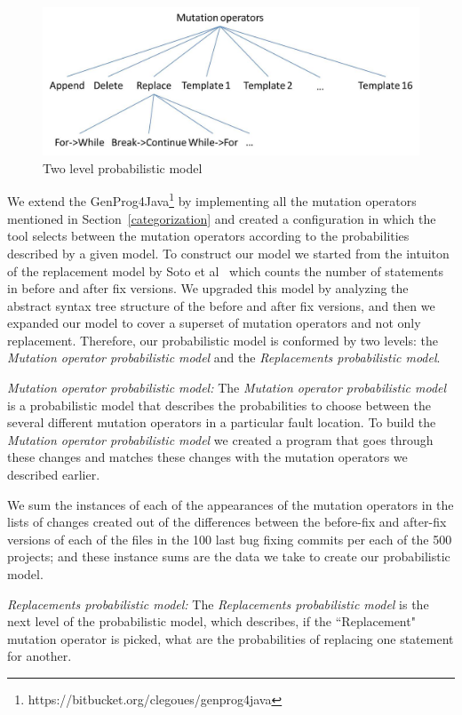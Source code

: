 \documentclass[conference]{IEEEtran}
\begin{document}
\begin{figure}[!h]
  \centering
    \includegraphics[scale=0.4]{Picture2}
  \caption{Two level probabilistic model}
  \label{fig:probModel}
\end{figure}

We extend the GenProg4Java\footnote{https://bitbucket.org/clegoues/genprog4java}
by implementing all the mutation operators mentioned in
Section~\ref{categorization} and created a configuration in which the tool 
selects between the mutation operators according to the probabilities described by
a given model. To construct our model we started from the intuiton of the replacement model by Soto et al~\cite{Soto15} which counts the number of statements in before and after fix versions. We upgraded this model by analyzing the abstract syntax tree structure of the before and after fix versions, and then we expanded our model to cover a superset of mutation operators and not only replacement. Therefore, our probabilistic model is conformed by two levels: the 
\textit{Mutation operator probabilistic model} and 
the \textit{Replacements probabilistic model}.

\emph{Mutation operator probabilistic model:}
The \textit{Mutation operator probabilistic model} is a probabilistic model that 
describes the probabilities to choose between the several different mutation 
operators in a particular fault location.
%
To build the \textit{Mutation operator probabilistic model} we created 
a program that goes through these 
changes and matches these changes with the mutation operators we described 
earlier.

We sum the instances of each of the appearances of the mutation operators in the 
lists of changes created out of the differences between the before-fix and 
after-fix versions of each of the files in the 100 last bug fixing commits per 
each of the 500 projects; and these instance sums are the data we take to create 
our probabilistic model.

\emph{Replacements probabilistic model:}
The \textit{Replacements probabilistic model} is the next level of the 
probabilistic model, which describes, if the ``Replacement" mutation operator is 
picked, what are the probabilities of replacing one statement for another. 
\end{document}
